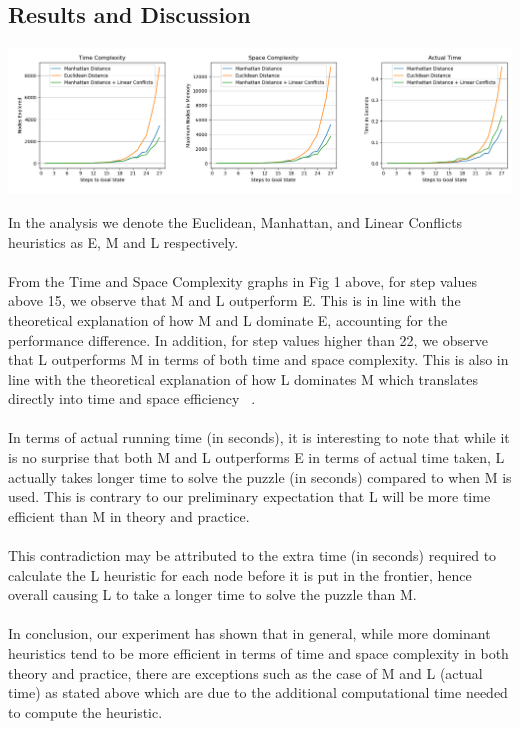 \documentclass[runningheads]{llncs}
\begin{document}
\subsection{Results and Discussion}
\begin{centering}
    \includegraphics[width=\textwidth]{Figure_1.png}
\end{centering}
In the analysis we denote the Euclidean, Manhattan, and Linear Conflicts heuristics as E, M and L respectively. \\ \\
From the Time and Space Complexity graphs in Fig 1 above, for step values above 15, we observe that M and L outperform E. This is in line with the theoretical explanation of how M and L dominate E, accounting for the performance difference. In addition, for step values higher than 22, we observe that L outperforms M in terms of both time and space complexity. This is also in line with the theoretical explanation of how L dominates M which translates directly into time and space efficiency ~\cite[p104]{stuart_russell_artifical_2010}.\\ \\
In terms of actual running time (in seconds), it is interesting to note that while it is no surprise that both M and L outperforms E in terms of actual time taken, L actually takes longer time to solve the puzzle (in seconds) compared to when M is used.  This is contrary to our preliminary expectation that L will be more time efficient than M in theory and practice. \\ \\
This contradiction may be attributed to the extra time (in seconds) required to calculate the L heuristic for each node before it is put in the frontier, hence overall causing L to take a longer time to solve the puzzle than M. \\ \\
In conclusion, our experiment has shown that in general, while more dominant heuristics tend to be more efficient in terms of time and space complexity in both theory and practice, there are exceptions such as the case of M and L (actual time) as stated above which are due to the additional computational time needed to compute the heuristic.
%
%
%
\pagebreak


\end{document}
